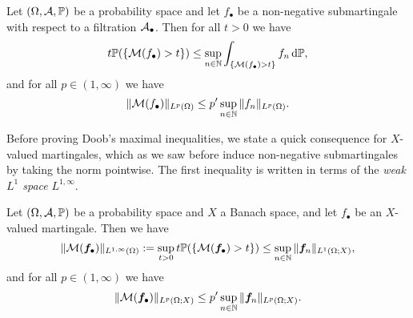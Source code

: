 \begin{thm}\label{thm:doob}
  Let $(\Omega, \mathcal{A}, \mathbb{P})$ be a probability space and let $f_{\bullet}$ be a non-negative submartingale with respect to a filtration $\mathcal{A}_{\bullet}$.
  Then for all $t > 0$ we have
  \begin{equation*}
    t\mathbb{P}(\{\mathcal{M}(f_{\bullet}) > t\}) \leq   \sup_{n \in \mathbb{N}} \int_{\{\mathcal{M}(f_{\bullet}) > t\}} f_{n} \, \mathrm{d}\mathbb{P},
  \end{equation*}
  and for all $p \in (1,\infty)$ we have
  \begin{equation*}
    \|\mathcal{M}(f_{\bullet})\|_{L^p(\Omega)} \leq p' \sup_{n \in \mathbb{N}} \|f_{n}\|_{L^p(\Omega)}.
  \end{equation*}
\end{thm}

Before proving Doob's maximal inequalities, we state a quick consequence for $X$-valued martingales, which as we saw before induce non-negative submartingales by taking the norm pointwise.
The first inequality is written in terms of the \emph{weak $L^1$ space} $L^{1,\infty}$.

\begin{cor}
  Let $(\Omega, \mathcal{A}, \mathbb{P})$ be a probability space and $X$ a Banach space, and let $f_{\bullet}$ be an $X$-valued martingale.
  Then we have
  \begin{equation*}
    \|\mathcal{M}(\bm{f}_{\bullet})\|_{L^{1,\infty}(\Omega)} :=  \sup_{t > 0} t\mathbb{P}(\{\mathcal{M}(\bm{f}_{\bullet}) > t\}) \leq  \sup_{n \in \mathbb{N}} \|\bm{f}_{n}\|_{L^1(\Omega;X)},
  \end{equation*}
  and for all $p \in (1,\infty)$ we have
  \begin{equation*}
    \|\mathcal{M}(\bm{f}_{\bullet})\|_{L^p(\Omega;X)} \leq p' \sup_{n \in \mathbb{N}} \|\bm{f}_{n}\|_{L^p(\Omega;X)}.
  \end{equation*}
\end{cor}

